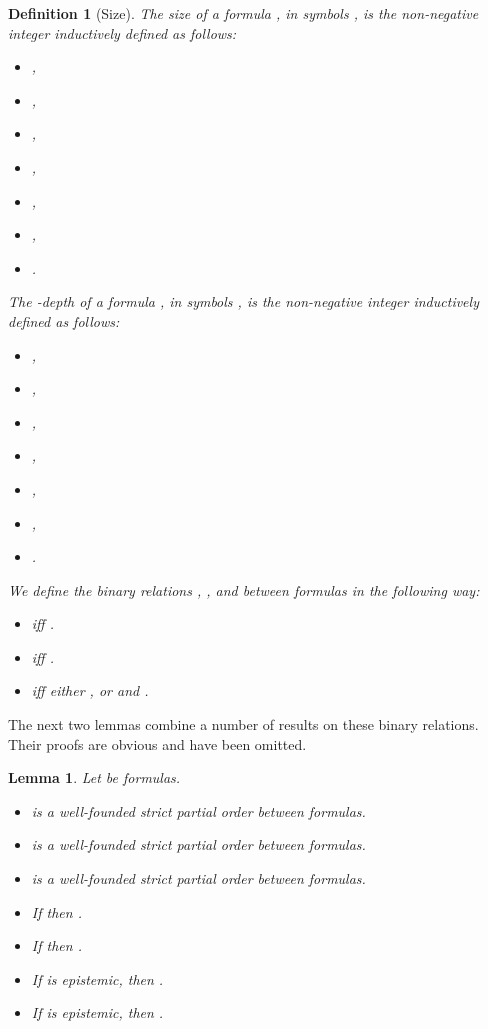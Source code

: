 \documentclass{article}[12pt]
\newtheorem{lemma}{Lemma}
\newtheorem{definition}{Definition}
\begin{document}
\begin{definition}[Size]
The size of a formula , in symbols , is the non-negative integer inductively defined as follows:
\begin{itemize}
\item ,
\item ,
\item ,
\item ,
\item ,
\item ,
\item .
\end{itemize}
The -depth of a formula , in symbols , is the non-negative integer inductively defined as follows:
\begin{itemize}
\item ,
\item ,
\item ,
\item ,
\item ,
\item ,
\item .
\end{itemize}
We define the binary relations ,  , and  between formulas in the following way:
\begin{itemize}
\item  iff .
\item  iff .
\item  iff either , or  and .
\end{itemize}

\end{definition}
The next two lemmas combine a number of results on these binary relations.
Their proofs are obvious and have been omitted.
\begin{lemma} \label{gather.lemma} Let  be formulas.
\begin{itemize}
\item \label{lem_1b}
 is a well-founded strict partial order between formulas.
\item \label{lem_1c}
 is a well-founded strict partial order between formulas.
\item \label{lem_1}
 is a well-founded strict partial order between formulas.
\item \label{lem_1bh}
If  then .
\item \label{lem_hans} If  then .
\item \label{lem_1a}
If  is epistemic, then .
\item If  is epistemic, then .
\end{itemize}
\end{lemma}
\end{document}
